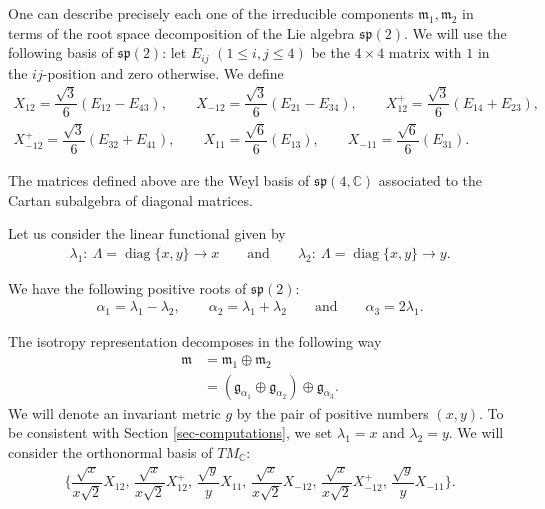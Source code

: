 \documentclass[pdftex]{sigma}%
\numberwithin{equation}{section}
\DeclareMathOperator{\Diag}{diag}
\begin{document}
One can describe precisely each one of the irreducible components $\mathfrak{m}_1, \mathfrak{m}_2$ in terms of the root space decomposition of the Lie algebra $\mathfrak{sp}(2)$. We will use the following basis of $\mathfrak{sp}(2)$: let $E_{ij}$ $(1 \leq i,j \leq 4)$ be the $4 \times 4$ matrix with $1$ in the $ij$-position and zero otherwise. We define
\begin{gather*}
X_{12} = \dfrac{\sqrt{3}}{6}(E_{12}-E_{43}), \qquad
X_{-12} = \dfrac{\sqrt{3}}{6}(E_{21} - E_{34}), \qquad
X_{12}^{+} = \dfrac{\sqrt{3}}{6}(E_{14}+E_{23}),
\\
X_{-12}^{+} = \dfrac{\sqrt{3}}{6}(E_{32}+E_{41}), \qquad
X_{11} = \dfrac{\sqrt{6}}{6}(E_{13}), \qquad
X_{-11} = \dfrac{\sqrt{6}}{6}(E_{31}).
\end{gather*}

The matrices defined above are the Weyl basis of $\mathfrak{sp}(4,\mathbb{C})$ associated to the Cartan subalgebra of diagonal matrices.

Let us consider the linear functional given by
\begin{gather*}
\lambda_{1}\colon\ \Lambda=\Diag\{x,y\}\longrightarrow x \qquad\text{and}\qquad
\lambda_{2}\colon\ \Lambda=\Diag\{x,y\}\longrightarrow y.
\end{gather*}

We have the following positive roots of $\mathfrak{sp}(2)$:
\begin{gather*}
\alpha_{1}=\lambda_{1}-\lambda_{2}, \qquad \alpha_{2}=\lambda_{1}+\lambda_{2} \qquad \text{and} \qquad \alpha_{3}=2\lambda_{1}.
\end{gather*}

The isotropy representation decomposes in the following way
\begin{align*}
\mathfrak{m}&=\mathfrak{m}_{1}\oplus \mathfrak{m}_{2}
\\
&=(\mathfrak{g}_{\alpha_{1}}\oplus \mathfrak{g}_{\alpha_{2}}) \oplus \mathfrak{g}_{\alpha_{3}}.
\end{align*}
We will denote an invariant metric $g$ by the pair of positive numbers $(x,y)$. To be consistent with Section \ref{sec-computations}, we set $\lambda_{1}=x$ and $\lambda_{2}=y$. We will consider the orthonormal basis of $TM_{\mathbb{C}}$:
\begin{gather*}
\bigg\{\dfrac{\sqrt{x}}{x\sqrt{2}}X_{12}, \, \dfrac{\sqrt{x}}{x\sqrt{2}}X_{12}^{+},\,\dfrac{\sqrt{y}}{y}X_{11},\,\dfrac{\sqrt{x}}{x\sqrt{2}}X_{-12},\, \dfrac{\sqrt{x}}{x\sqrt{2}}X_{-12}^{+},\,\dfrac{\sqrt{y}}{y}X_{-11}\bigg\}.
\end{gather*}
\end{document}
